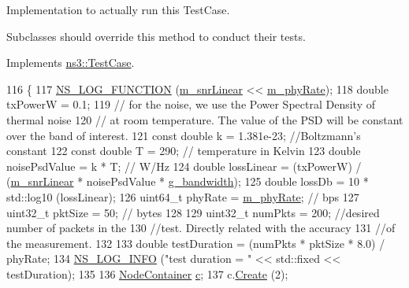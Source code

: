 Implementation to actually run this Test\+Case. 

Subclasses should override this method to conduct their tests. 

Implements \hyperlink{classns3_1_1TestCase_a8ff74680cf017ed42011e4be51917a24}{ns3\+::\+Test\+Case}.


\begin{DoxyCode}
116 \{  
117   \hyperlink{log-macros-disabled_8h_a90b90d5bad1f39cb1b64923ea94c0761}{NS\_LOG\_FUNCTION} (\hyperlink{classSpectrumIdealPhyTestCase_a3934f63bf1d4b1924f88f40b7986fb9c}{m\_snrLinear} << \hyperlink{classSpectrumIdealPhyTestCase_a9cfb76527300fd830e2b43ad70c580d6}{m\_phyRate});
118   \textcolor{keywordtype}{double} txPowerW = 0.1; 
119   \textcolor{comment}{// for the noise, we use the Power Spectral Density of thermal noise}
120   \textcolor{comment}{// at room temperature. The value of the PSD will be constant over the band of interest.}
121   \textcolor{keyword}{const} \textcolor{keywordtype}{double} k = 1.381e-23; \textcolor{comment}{//Boltzmann's constant}
122   \textcolor{keyword}{const} \textcolor{keywordtype}{double} T = 290; \textcolor{comment}{// temperature in Kelvin}
123   \textcolor{keywordtype}{double} noisePsdValue = k * T; \textcolor{comment}{// W/Hz}
124   \textcolor{keywordtype}{double} lossLinear = (txPowerW) / (\hyperlink{classSpectrumIdealPhyTestCase_a3934f63bf1d4b1924f88f40b7986fb9c}{m\_snrLinear} * noisePsdValue * 
      \hyperlink{spectrum-ideal-phy-test_8cc_afbfecc6762036c7df663ddb65ccae7a9}{g\_bandwidth}); 
125   \textcolor{keywordtype}{double} lossDb = 10 * std::log10 (lossLinear);
126   uint64\_t phyRate = \hyperlink{classSpectrumIdealPhyTestCase_a9cfb76527300fd830e2b43ad70c580d6}{m\_phyRate}; \textcolor{comment}{// bps}
127   uint32\_t pktSize = 50; \textcolor{comment}{// bytes}
128 
129   uint32\_t numPkts = 200; \textcolor{comment}{//desired number of packets in the}
130                           \textcolor{comment}{//test. Directly related with the accuracy}
131                           \textcolor{comment}{//of the measurement. }
132 
133   \textcolor{keywordtype}{double} testDuration = (numPkts * pktSize * 8.0) / phyRate;
134   \hyperlink{group__logging_gafbd73ee2cf9f26b319f49086d8e860fb}{NS\_LOG\_INFO} (\textcolor{stringliteral}{"test duration = "} << std::fixed << testDuration);
135 
136   \hyperlink{classns3_1_1NodeContainer}{NodeContainer} \hyperlink{lte_2model_2fading-traces_2fading__trace__generator_8m_ae0323a9039add2978bf5b49550572c7c}{c};
137   c.\hyperlink{classns3_1_1NodeContainer_a787f059e2813e8b951cc6914d11dfe69}{Create} (2);

\end{DoxyCode}
